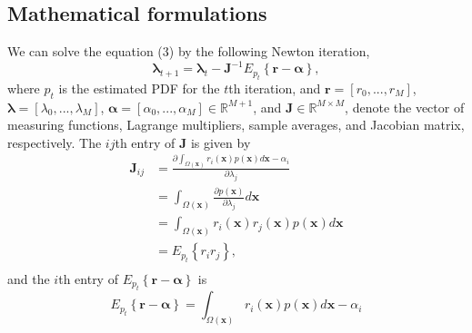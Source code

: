 \documentclass[conference]{IEEEtran}
\begin{document}
\subsection{Mathematical formulations} 
We can solve the equation (3) by the following Newton iteration,
%
\begin{equation}
\boldsymbol{\lambda}_{t+1} = \boldsymbol{\lambda}_{t} - \mathbf{J}^{-1} E_{p_{t}} \left\{\boldsymbol r - \boldsymbol\alpha\right\},
\end{equation}
%
where $p_t$ is the estimated PDF for the $t$th iteration, and        $\mathbf{r}=[r_0,...,r_M]$, $\boldsymbol{\lambda}=[\lambda_0,...,\lambda_M]$, $\boldsymbol{\alpha}=[\alpha_0,...,\alpha_M] \in \mathbb{R}^{M+1}$, and $\mathbf{J} \in \mathbb{R}^{M\times{M}}$, denote the vector of measuring functions, Lagrange multipliers, sample averages, and Jacobian matrix, respectively. The $ij$th entry of $\mathbf{J}$ is given by
%
\begin{equation} 
\begin{split}
 \mathbf{J}_{ij} &= \frac{\partial\int_{\Omega(\mathbf{x})} r_i(\mathbf{x}) p(\mathbf{x}) d \mathbf{x} - \alpha_i}{\partial\lambda_{j}} \\
 &= \int_{\Omega(\mathbf{x})} \frac{\partial p(\mathbf{x})}{\partial\lambda_{j}}  d \mathbf{x} \\
 &= \int_{\Omega(\mathbf{x})} r_i(\mathbf{x}) r_j(\mathbf{x}) p(\mathbf{x}) d \mathbf{x} \\
 &= E_{p_{t}}\left\{r_ir_j\right\},  \\
\end{split}
\end{equation}
%
and the  $i$th entry of $E_{p_{t}} \left\{\boldsymbol{r} - \boldsymbol\alpha\right\}$ is
%
\begin{equation}
E_{p_{t}} \left\{\boldsymbol{r} - \boldsymbol\alpha\right\}= \int_{\Omega(\mathbf{x})} r_i(\mathbf{x}) p(\mathbf{x}) d \mathbf{x} - \alpha_i
\end{equation}
%
	
\end{document}
